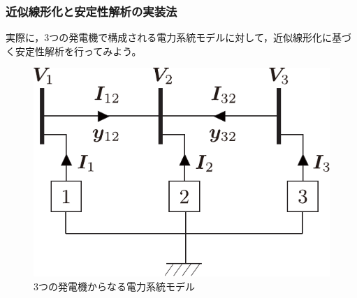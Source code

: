 \documentclass[tombow,dvipdfmx]{corona-a5}
\begin{document}
\subsubsection{近似線形化と安定性解析の実装法}


実際に，3つの発電機で構成される電力系統モデルに対して，近似線形化に基づく安定性解析を行ってみよう。

\begin{figure}[t]
\centering
\includegraphics[width = .30\linewidth]{figs/3busex}
\caption{3つの発電機からなる電力系統モデル}
\label{fig:3genex}
\end{figure}
\end{document}
